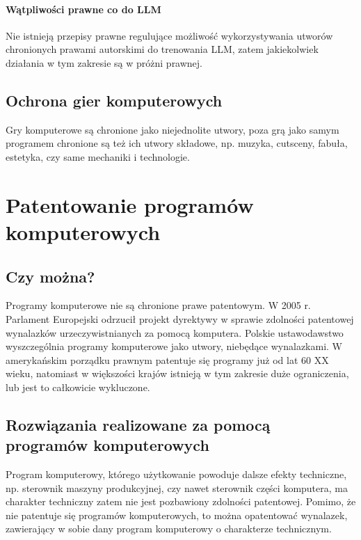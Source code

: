 \documentclass{article}
\begin{document}
\paragraph{Wątpliwości prawne co do LLM}

Nie istnieją przepisy prawne regulujące możliwość wykorzystywania utworów chronionych prawami autorskimi do trenowania LLM, zatem jakiekolwiek działania w tym zakresie są w próżni prawnej.

\subsection{Ochrona gier komputerowych}

Gry komputerowe są chronione jako niejednolite utwory, poza grą jako samym programem chronione są też ich utwory składowe, np. muzyka, cutsceny, fabuła, estetyka, czy same mechaniki i technologie.

\section{Patentowanie programów komputerowych}

\subsection{Czy można?}

Programy komputerowe nie są chronione prawe patentowym. W 2005 r. Parlament Europejski odrzucił projekt dyrektywy w sprawie zdolności patentowej wynalazków urzeczywistnianych za pomocą komputera.
Polskie ustawodawstwo wyszczególnia programy komputerowe jako utwory, niebędące wynalazkami.
W amerykańskim porządku prawnym patentuje się programy już od lat 60 XX wieku, natomiast w większości krajów istnieją w tym zakresie duże ograniczenia, lub jest to całkowicie wykluczone.

\subsection{Rozwiązania realizowane za pomocą programów komputerowych}

Program komputerowy, którego użytkowanie powoduje dalsze efekty techniczne, np. sterownik maszyny produkcyjnej, czy nawet sterownik części komputera, ma charakter techniczny zatem nie jest pozbawiony zdolności patentowej. Pomimo, że nie patentuje się programów komputerowych, to można opatentować wynalazek, zawierający w sobie dany program komputerowy o charakterze technicznym.
\end{document}
